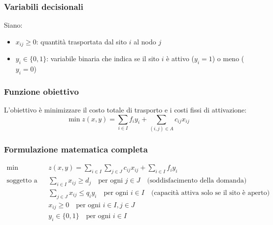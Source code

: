 \subsubsection{Variabili decisionali}
Siano:
\begin{itemize}
    \item $x_{ij} \geq 0$: quantità trasportata dal sito $i$ al nodo $j$
    \item $y_i \in \{0,1\}$: variabile binaria che indica se il sito $i$ è attivo ($y_i = 1$) o meno ($y_i = 0$)
\end{itemize}

\subsubsection{Funzione obiettivo}
L'obiettivo è minimizzare il costo totale di trasporto e i costi fissi di attivazione:
\[
\min z(x, y) = \sum_{i \in I} f_i y_i + \sum_{(i,j) \in A} c_{ij} x_{ij}
\]

\subsubsection{Formulazione matematica completa}
\[
\begin{aligned}
\min \quad & z(x, y) = \sum_{i \in I} \sum_{j \in J} c_{ij} x_{ij} + \sum_{i \in I} f_i y_i \\
\text{soggetto a} \quad & \sum_{i \in I} x_{ij} \geq d_j \quad \text{per ogni } j \in J \quad \text{(soddisfacimento della domanda)} \\
& \sum_{j \in J} x_{ij} \leq q_i y_i \quad \text{per ogni } i \in I \quad \text{(capacità attiva solo se il sito è aperto)} \\
& x_{ij} \geq 0 \quad \text{per ogni } i \in I, j \in J \\
& y_i \in \{0, 1\} \quad \text{per ogni } i \in I
\end{aligned}
\]